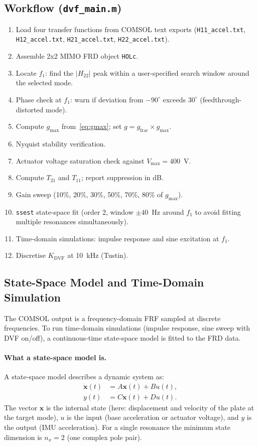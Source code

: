 \documentclass[12pt,a4paper]{article}
\begin{document}
\subsection{Workflow (\texttt{dvf\_main.m})}

\begin{enumerate}
  \item Load four transfer functions from COMSOL text exports
        (\texttt{H11\_accel.txt}, \texttt{H12\_accel.txt},
         \texttt{H21\_accel.txt}, \texttt{H22\_accel.txt}).
  \item Assemble 2x2 MIMO FRD object \texttt{HOLc}.
  \item Locate $f_1$: find the $|H_{22}|$ peak within a user-specified
        search window around the selected mode.
  \item Phase check at $f_1$: warn if deviation from $-90^\circ$ exceeds
        $30^\circ$ (feedthrough-distorted mode).
  \item Compute $g_\text{max}$ from~\eqref{eq:gmax}; set $g = g_\text{frac}
        \times g_\text{max}$.
  \item Nyquist stability verification.
  \item Actuator voltage saturation check against $V_\text{max} = 400$~V.
  \item Compute $T_{21}$ and $T_{11}$; report suppression in dB.
  \item Gain sweep (10\%, 20\%, 30\%, 50\%, 70\%, 80\% of $g_\text{max}$).
  \item \texttt{ssest} state-space fit (order 2, window $\pm 40$~Hz around $f_1$
        to avoid fitting multiple resonances simultaneously).
  \item Time-domain simulations: impulse response and sine excitation at $f_1$.
  \item Discretise $K_\text{DVF}$ at 10~kHz (Tustin).
\end{enumerate}

\subsection{State-Space Model and Time-Domain Simulation}
\label{sec:ssest}

The COMSOL output is a frequency-domain FRF sampled at discrete frequencies.  To
run time-domain simulations (impulse response, sine sweep with DVF on/off), a
continuous-time state-space model is fitted to the FRD data.

\paragraph{What a state-space model is.}
A state-space model describes a dynamic system as:
\begin{align}
  \dot{\mathbf{x}}(t) &= A\mathbf{x}(t) + B u(t), \label{eq:ss_state} \\
  y(t) &= C\mathbf{x}(t) + D u(t). \label{eq:ss_out}
\end{align}
The vector $\mathbf{x}$ is the internal state (here: displacement and velocity of
the plate at the target mode), $u$ is the input (base acceleration or actuator
voltage), and $y$ is the output (IMU acceleration).  For a single resonance the
minimum state dimension is $n_x = 2$ (one complex pole pair).
\end{document}
